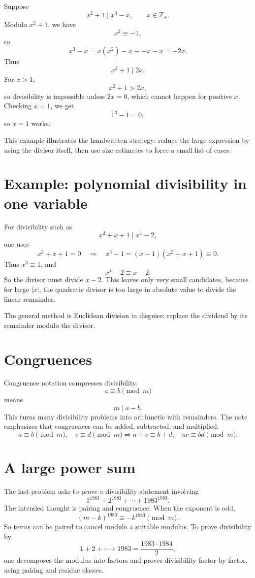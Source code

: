 Suppose
\[
  x^2+1\mid x^3-x,\qquad x\in\mathbb Z_+.
\]
Modulo \(x^2+1\), we have
\[
  x^2\equiv -1,
\]
so
\[
  x^3-x=x(x^2)-x\equiv -x-x=-2x.
\]
Thus
\[
  x^2+1\mid 2x.
\]
For \(x>1\),
\[
  x^2+1>2x,
\]
so divisibility is impossible unless \(2x=0\), which cannot happen for positive \(x\).  Checking \(x=1\), we get
\[
  1^3-1=0,
\]
so \(x=1\) works.

This example illustrates the handwritten strategy: reduce the large expression by using the divisor itself, then use size estimates to force a small list of cases.

\section{Example: polynomial divisibility in one variable}

For divisibility such as
\[
  x^2+x+1\mid x^4-2,
\]
one uses
\[
  x^2+x+1=0\quad\Longrightarrow\quad x^3-1=(x-1)(x^2+x+1)\equiv0.
\]
Thus \(x^3\equiv1\), and
\[
  x^4-2\equiv x-2.
\]
So the divisor must divide \(x-2\).  This leaves only very small candidates, because for large \(|x|\), the quadratic divisor is too large in absolute value to divide the linear remainder.

The general method is Euclidean division in disguise: replace the dividend by its remainder modulo the divisor.

\section{Congruences}

Congruence notation compresses divisibility:
\[
  a\equiv b\pmod m
\]
means
\[
  m\mid a-b.
\]
This turns many divisibility problems into arithmetic with remainders.  The note emphasizes that congruences can be added, subtracted, and multiplied:
\[
  a\equiv b\pmod m,\quad c\equiv d\pmod m
  \Longrightarrow
  a+c\equiv b+d,\quad ac\equiv bd\pmod m.
\]

\section{A large power sum}

The last problem asks to prove a divisibility statement involving
\[
  1^{1983}+2^{1983}+\cdots+1983^{1983}.
\]
The intended thought is pairing and congruence.  When the exponent is odd,
\[
  (m-k)^{1983}\equiv -k^{1983}\pmod m.
\]
So terms can be paired to cancel modulo a suitable modulus.  To prove divisibility by
\[
  1+2+\cdots+1983=\frac{1983\cdot1984}{2},
\]
one decomposes the modulus into factors and proves divisibility factor by factor, using pairing and residue classes.

